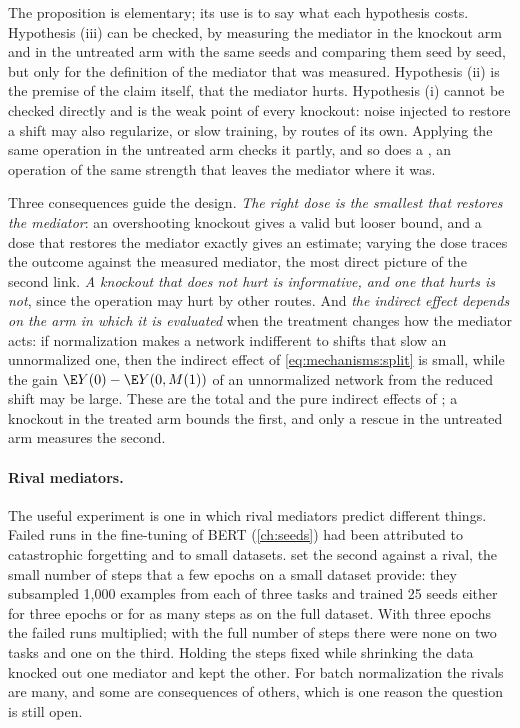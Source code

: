 \begin{refsection}
The proposition is elementary; its use is to say what each hypothesis costs. Hypothesis (iii) can be checked, by measuring the mediator in the knockout arm and in the untreated arm with the same seeds and comparing them seed by seed, but only for the definition of the mediator that was measured. Hypothesis (ii) is the premise of the claim itself, that the mediator hurts. Hypothesis (i) cannot be checked directly and is the weak point of every knockout: noise injected to restore a shift may also regularize, or slow training, by routes of its own. Applying the same operation in the untreated arm checks it partly, and so does a , an operation of the same strength that leaves the mediator where it was.

Three consequences guide the design. \emph{The right dose is the smallest that restores the mediator}: an overshooting knockout gives a valid but looser bound, and a dose that restores the mediator exactly gives an estimate; varying the dose traces the outcome against the measured mediator, the most direct picture of the second link. \emph{A knockout that does not hurt is informative, and one that hurts is not}, since the operation may hurt by other routes. And \emph{the indirect effect depends on the arm in which it is evaluated} when the treatment changes how the mediator acts: if normalization makes a network indifferent to shifts that slow an unnormalized one, then the indirect effect of \eqref{eq:mechanisms:split} is small, while the gain $\E Y(0)-\E Y(0,M(1))$ of an unnormalized network from the reduced shift may be large. These are the total and the pure indirect effects of \textcite{RobinsGreenland1992}; a knockout in the treated arm bounds the first, and only a rescue in the untreated arm measures the second.

\paragraph{Rival mediators.} The useful experiment is one in which rival mediators predict different things. Failed runs in the fine-tuning of BERT (\cref{ch:seeds}) had been attributed to catastrophic forgetting and to small datasets. \Textcite{MosbachEtAl2021} set the second against a rival, the small number of steps that a few epochs on a small dataset provide: they subsampled 1,000 examples from each of three tasks and trained 25 seeds either for three epochs or for as many steps as on the full dataset. With three epochs the failed runs multiplied; with the full number of steps there were none on two tasks and one on the third. Holding the steps fixed while shrinking the data knocked out one mediator and kept the other. For batch normalization the rivals are many, and some are consequences of others, which is one reason the question is still open.


\end{refsection}
